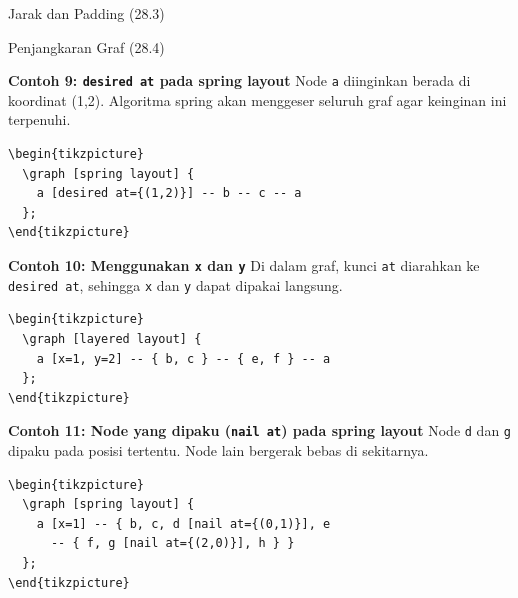 \documentclass[aspectratio=169]{beamer}
\begin{document}
\begin{frame}{Jarak dan Padding (28.3)}


\end{frame}

\begin{frame}{Penjangkaran Graf (28.4)}


\textbf{Contoh 9: \texttt{desired at} pada spring layout}
Node \texttt{a} diinginkan berada di koordinat (1,2). Algoritma spring akan menggeser seluruh graf agar keinginan ini terpenuhi.
\begin{lstlisting}
\begin{tikzpicture}
  \graph [spring layout] {
    a [desired at={(1,2)}] -- b -- c -- a
  };
\end{tikzpicture}
\end{lstlisting}
\begin{center}\end{center}


\textbf{Contoh 10: Menggunakan \texttt{x} dan \texttt{y}}
Di dalam graf, kunci \texttt{at} diarahkan ke \texttt{desired at}, sehingga \texttt{x} dan \texttt{y} dapat dipakai langsung.
\begin{lstlisting}
\begin{tikzpicture}
  \graph [layered layout] {
    a [x=1, y=2] -- { b, c } -- { e, f } -- a
  };
\end{tikzpicture}
\end{lstlisting}
\begin{center}\end{center}


\textbf{Contoh 11: Node yang dipaku (\texttt{nail at}) pada spring layout}
Node \texttt{d} dan \texttt{g} dipaku pada posisi tertentu. Node lain bergerak bebas di sekitarnya.
\begin{lstlisting}
\begin{tikzpicture}
  \graph [spring layout] {
    a [x=1] -- { b, c, d [nail at={(0,1)}], e
      -- { f, g [nail at={(2,0)}], h } }
  };
\end{tikzpicture}
\end{lstlisting}
\begin{center}\end{center}



\end{frame}
\end{document}
